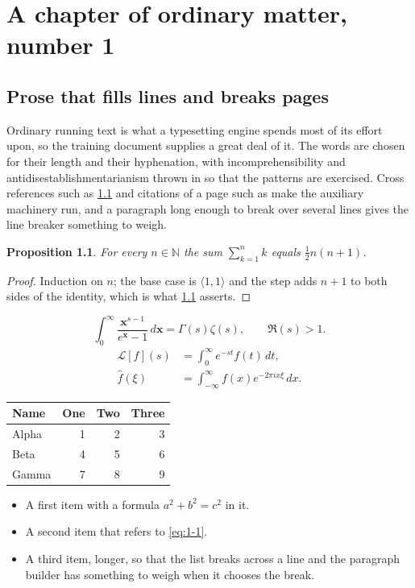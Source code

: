 \documentclass[11pt,a4paper]{report}
\theoremstyle{plain}
\newtheorem{proposition}{Proposition}[chapter]
\newcommand{\vecn}[1]{\mathbf{#1}}
\newcommand{\pairs}[2]{\langle #1,#2\rangle}
\begin{document}
\tableofcontents
\chapter{A chapter of ordinary matter, number 1}
\section{Prose that fills lines and breaks pages}
\label{sec:prose1-1}
Ordinary running text is what a typesetting engine spends most of its effort
upon, so the training document supplies a great deal of it. The words are
chosen for their length and their hyphenation, with incomprehensibility and
antidisestablishmentarianism thrown in so that the patterns are exercised.
Cross references such as \cref{sec:prose1-1} and citations of a page such
as \pageref{sec:prose1-1} make the auxiliary machinery run, and a
paragraph long enough to break over several lines gives the line breaker
something to weigh.
\begin{proposition}\label{prop:1-1}
For every $n\in\mathbb{N}$ the sum $\sum_{k=1}^{n}k$ equals
$\tfrac{1}{2}n(n+1)$.
\end{proposition}
\begin{proof}
Induction on $n$; the base case is $\pairs{1}{1}$ and the step adds $n+1$ to
both sides of the identity, which is what \cref{prop:1-1} asserts.
\end{proof}
\begin{equation}\label{eq:1-1}
  \int_{0}^{\infty}\frac{\vecn{x}^{s-1}}{e^{\vecn{x}}-1}\,d\vecn{x}
    = \Gamma(s)\zeta(s),\qquad \Re(s)>1 .
\end{equation}
\begin{align}
  \mathcal{L}[f](s) &= \int_{0}^{\infty} e^{-st} f(t)\,dt, \\
  \widehat{f}(\xi)  &= \int_{-\infty}^{\infty} f(x) e^{-2\pi i x\xi}\,dx .
\end{align}
\par\noindent\begin{center}
\begin{tabular}{lrrr}
\hline
Name & One & Two & Three \\
\hline
Alpha & 1 & 2 & 3 \\
Beta & 4 & 5 & 6 \\
Gamma & 7 & 8 & 9 \\
\hline
\end{tabular}
\end{center}
\begin{itemize}
  \item A first item with a formula $a^2+b^2=c^2$ in it.
  \item A second item that refers to \eqref{eq:1-1}.
  \item A third item, longer, so that the list breaks across a line and the
    paragraph builder has something to weigh when it chooses the break.
\end{itemize}
\end{document}
